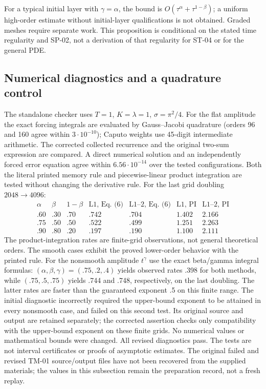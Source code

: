 \documentclass[11pt,a4paper]{amsart}
\theoremstyle{remark}
\theoremstyle{plain}
\theoremstyle{remark}
\numberwithin{equation}{section}
\begin{document}
For a typical initial layer with $\gamma=\alpha$, the bound is $O(\tau^\alpha+\tau^{1-\beta})$; a uniform high-order estimate without initial-layer qualifications is not obtained. Graded meshes require separate work. This proposition is conditional on the stated time regularity and SP-02, not a derivation of that regularity for ST-04 or for the general PDE.

\subsection{Numerical diagnostics and a quadrature control}
The standalone checker uses $T=1$, $K=\lambda=1$, $\sigma=\pi^2/4$. For the flat amplitude the exact forcing integrals are evaluated by Gauss--Jacobi quadrature (orders 96 and 160 agree within $3\cdot10^{-10}$); Caputo weights use 45-digit intermediate arithmetic. The corrected collected recurrence and the original two-sum expression are compared. A direct numerical solution and an independently forced error equation agree within $6.56\cdot10^{-14}$ over the tested configurations. Both the literal printed memory rule and piecewise-linear product integration are tested without changing the derivative rule. For the last grid doubling $2048\to4096$:
\[
\begin{array}{cc|c|cc|cc}
\alpha&\beta&1-\beta&\text{L1, Eq. (6)}&\text{L1--2, Eq. (6)}&\text{L1, PI}&\text{L1--2, PI}\\\hline
 .60&.30&.70&.742&.704&1.402&2.166\\
 .75&.50&.50&.522&.499&1.251&2.263\\
 .90&.80&.20&.197&.190&1.100&2.111
\end{array}
\]
The product-integration rates are finite-grid observations, not general theoretical orders. The smooth cases exhibit the proved lower-order behavior with the printed rule. For the nonsmooth amplitude $t^\gamma$ use the exact beta/gamma integral formulas: $(\alpha,\beta,\gamma)=(.75,.2,.4)$ yields observed rates .398 for both methods, while $(.75,.5,.75)$ yields .744 and .748, respectively, on the last doubling. The latter rates are faster than the guaranteed exponent .5 on this finite range. The initial diagnostic incorrectly required the upper-bound exponent to be attained in every nonsmooth case, and failed on this second test. Its original source and output are retained separately; the corrected assertion checks only compatibility with the upper-bound exponent on these finite grids. No numerical values or mathematical bounds were changed. All revised diagnostics pass. The tests are not interval certificates or proofs of asymptotic estimates. The original failed and revised TM-01 source/output files have not been recovered from the supplied materials; the values in this subsection remain the preparation record, not a fresh replay.
\end{document}
